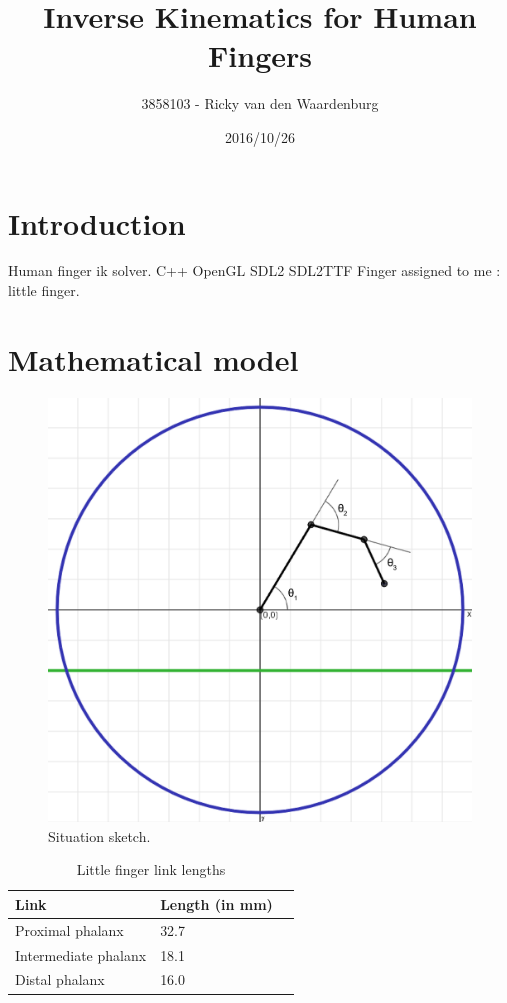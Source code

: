 \documentclass{article}
\title{Inverse Kinematics for Human Fingers}
\date{2016/10/26}
\author{3858103 - Ricky van den Waardenburg}
\begin{document}
\maketitle
\newpage

\section{Introduction}

Human finger ik solver. C++ OpenGL SDL2 SDL2TTF Finger assigned to me : little finger.

\section{Mathematical model}

\begin{figure}[h!]
\centering
\includegraphics[scale=0.15]{situation.png}
\caption{Situation sketch.}
\end{figure}

\begin{table}[h!]
\centering
\caption{Little finger link lengths}
\label{my-label}
\begin{tabular}{lll}
\hline
\textbf{Link}                 & \textbf{Length} (in mm) &  \\\hline
Proximal phalanx     & 32.7           &  \\
Intermediate phalanx & 18.1           &  \\
Distal phalanx       & 16.0           & \\\hline
\end{tabular}
\end{table}
\end{document}
